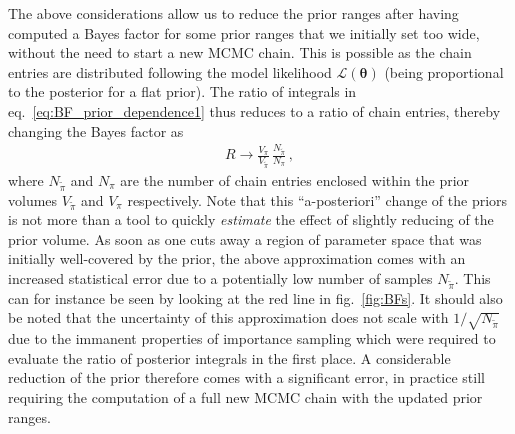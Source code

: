 	The above considerations allow us to reduce the prior ranges after having computed a Bayes factor for some prior ranges that we initially set too wide, without  the need to start a new \ac{MCMC} chain. This is possible as the chain entries are distributed following the model likelihood $\mathcal{L}(\bm{\theta})$ (being proportional to the posterior for a flat prior). The ratio of integrals in eq.~\eqref{eq:BF_prior_dependence1} thus reduces to a ratio of chain entries,
	thereby changing the Bayes factor as 
	\begin{align}
		R  \rightarrow \frac{V_\pi}{V_{\tilde{\pi}}} \,  \frac{N_{\tilde{\pi}}} {N_\pi} \, ,
	\end{align}
	where $N_{\tilde{\pi}}$ and $N_\pi$ are the number of chain entries enclosed within the prior volumes $V_{\tilde{\pi}}$ and $V_\pi$ respectively. Note that this ``a-posteriori'' change of the priors is not more than a tool to quickly \textit{estimate} the effect of slightly reducing of the prior volume. As soon as one cuts away a region of parameter space that was initially well-covered by the prior, the above approximation comes with an increased statistical error due to a potentially low number of samples $N_{\tilde{\pi}}$. This can for instance be seen by looking at the red line in fig.~\ref{fig:BFs}. It should also be noted that the uncertainty of this approximation does not scale with $1/\sqrt{N_{\tilde{\pi}}}$ due to the immanent properties of importance sampling which were required to evaluate the ratio of posterior integrals in the first place. A considerable reduction of the prior therefore comes with a significant error, in practice still requiring the computation of a full new \ac{MCMC} chain with the updated prior ranges.
	
